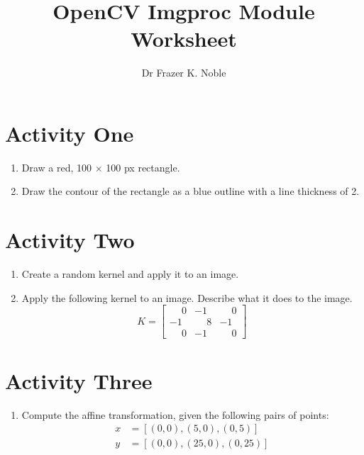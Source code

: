 \documentclass[12pt, A4]{article}
\title{OpenCV Imgproc Module Worksheet}
\author{Dr Frazer K. Noble}
\date{}
\begin{document}
\maketitle

\section*{Activity One}

\begin{enumerate}[label=(\alph*)]

    \item Draw a red, 100 $\times$ 100 px rectangle.

    \item Draw the contour of the rectangle as a blue outline with a line thickness of 2.

\end{enumerate}

\section*{Activity Two}

\begin{enumerate}[label=(\alph*)]

    \item Create a random kernel and apply it to an image.

    \item Apply the following kernel to an image. Describe what it does to the image.
    \begin{equation*}
        K = 
        \begin{bmatrix}
            \phantom{-}0 & -1 & \phantom{-}0\\
            -1 & \phantom{-}8 & -1\\
            \phantom{-}0 & -1 & \phantom{-}0            
        \end{bmatrix}
    \end{equation*}

\end{enumerate}

\section*{Activity Three}

\begin{enumerate}[label=(\alph*)]

    \item Compute the affine transformation, given the following pairs of points:
    \begin{equation*}
        \begin{split}
            x &= [(0,0), (5,0), (0,5)]\\
            y &= [(0,0), (25,0), (0, 25)]
        \end{split}
    \end{equation*}

\end{enumerate}
\end{document}
